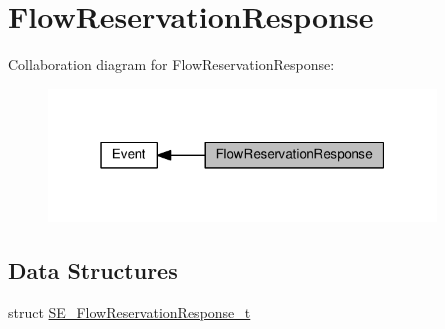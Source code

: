 \hypertarget{group__FlowReservationResponse}{}\section{Flow\+Reservation\+Response}
\label{group__FlowReservationResponse}
Collaboration diagram for Flow\+Reservation\+Response\+:\nopagebreak
\begin{figure}[H]
\begin{center}
\leavevmode
\includegraphics[width=292pt]{group__FlowReservationResponse}
\end{center}
\end{figure}
\subsection*{Data Structures}
\begin{DoxyCompactItemize}
\item 
struct \hyperlink{structSE__FlowReservationResponse__t}{S\+E\+\_\+\+Flow\+Reservation\+Response\+\_\+t}
\end{DoxyCompactItemize}
